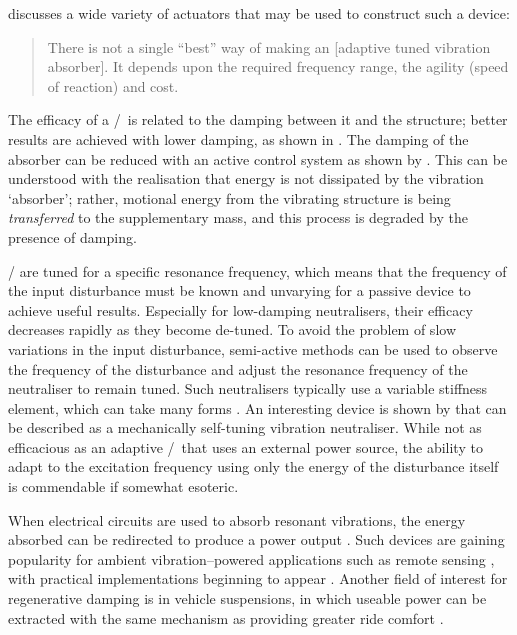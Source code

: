 \textcite{brennan2006} discusses a wide variety of actuators that may be used to construct such a device:
\begin{quote}
There is not a single ``best'' way of making an [adaptive tuned vibration absorber].
It depends upon the required frequency range, the agility (speed of reaction) and cost.
\end{quote}

The efficacy of a \vibneut/\ is related to the damping between it and the structure; better results are achieved with lower damping, as shown in .
The damping of the absorber can be reduced with an active control system as shown by \textcite{kidner1998}.
This can be understood with the realisation that energy is not dissipated by the vibration `absorber'; rather, motional energy from the vibrating structure is being \emph{transferred} to the supplementary mass, and this process is degraded by the presence of damping.

\Vibneut/ are tuned for a specific resonance frequency, which means that the frequency of the input disturbance must be known and unvarying for a passive device to achieve useful results.
Especially for low-damping neutralisers, their efficacy decreases rapidly as they become de-tuned.
To avoid the problem of slow variations in the input disturbance, semi-active methods can be used to observe the frequency of the disturbance and adjust the resonance frequency of the neutraliser to remain tuned.
Such neutralisers typically use a variable stiffness element, which can take many forms \cite{ting-kong1999,kidner2002,holdhusen2007}.
An interesting device is shown by \cite{ivers2008} that can be described as a mechanically self-tuning vibration neutraliser.
While not as efficacious as an adaptive \vibneut/\ that uses an external power source, the ability to adapt to the excitation frequency using only the energy of the disturbance itself is commendable if somewhat esoteric.

When electrical circuits are used to absorb resonant vibrations, the energy absorbed can be redirected to produce a power output \cite{stephen2006}.
Such devices are gaining popularity for ambient vibration--powered applications such as remote sensing \cite{arnold2007}, with practical implementations beginning to appear \cite{ferrari2009-sms}.
Another field of interest for regenerative damping is in vehicle suspensions, in which useable power can be extracted with the same mechanism as providing greater ride comfort \cite{graves2000thesis}.

